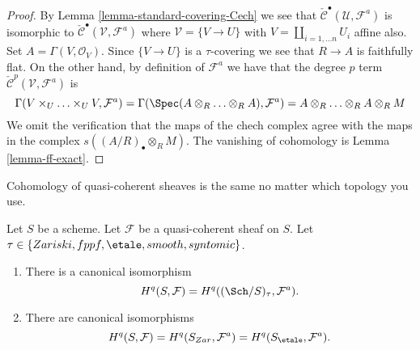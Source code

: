\begin{proof}
By Lemma \ref{lemma-standard-covering-Cech} we see that
$\check{\mathcal{C}}^\bullet(\mathcal{U}, \mathcal{F}^a)$
is isomorphic to $\check{\mathcal{C}}^\bullet(\mathcal{V}, \mathcal{F}^a)$
where $\mathcal{V} = \{V \to U\}$ with $V = \coprod_{i = 1, \ldots n} U_i$
affine also. Set $A = \Gamma(V, \mathcal{O}_V)$. Since $\{V \to U\}$
is a $\tau$-covering we see that $R \to A$ is faithfully flat.
On the other hand, by definition of $\mathcal{F}^a$ we have
that the degree $p$ term $\check{\mathcal{C}}^p(\mathcal{V}, \mathcal{F}^a)$
is
$$
\Gamma(V \times_U \ldots \times_U V, \mathcal{F}^a)
=
\Gamma(\Spec(A \otimes_R \ldots \otimes_R A), \mathcal{F}^a)
=
A \otimes_R \ldots \otimes_R A \otimes_R M
$$
We omit the verification that the maps of the chech complex agree with
the maps in the complex $s((A/R)_\bullet \otimes_R M)$. The vanishing
of cohomology is Lemma \ref{lemma-ff-exact}.
\end{proof}

\begin{proposition}
\label{proposition-same-cohomology-quasi-coherent}
\begin{slogan}
Cohomology of quasi-coherent sheaves is the same no matter which
topology you use.
\end{slogan}
Let $S$ be a scheme. Let $\mathcal{F}$ be a quasi-coherent sheaf on $S$.
Let $\tau \in \{Zariski, \linebreak[0] fppf, \linebreak[0]
\etale, \linebreak[0] smooth, \linebreak[0] syntomic\}$.
\begin{enumerate}
\item There is a canonical isomorphism
$$
H^q(S, \mathcal{F}) = H^q((\Sch/S)_\tau, \mathcal{F}^a).
$$
\item There are canonical isomorphisms
$$
H^q(S, \mathcal{F}) =
H^q(S_{Zar}, \mathcal{F}^a) =
H^q(S_\etale, \mathcal{F}^a).
$$
\end{enumerate}
\end{proposition}

